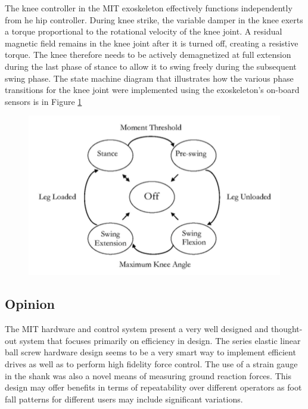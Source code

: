  The knee controller in the MIT exoskeleton effectively functions independently from he hip controller.  During knee strike, the variable damper in the knee exerts a torque proportional to the rotational velocity of the knee joint.  A residual magnetic field remains in the knee joint after it is turned off, creating a resistive torque.  The knee therefore needs to be actively demagnetized at full extension during the last phase of stance to allow it to swing freely during the subsequent swing phase.  The state machine diagram that illustrates how the various phase transitions for the knee joint were implemented using the exoskeleton's on-board sensors is in Figure \ref{fig:kneeControl} 
  \begin{figure}[thpb]
\centering
\includegraphics[width=3.in]{exos/figs/MIT/kneeControl}
  \caption{}
  \vspace{-0.2in}
 \label{fig:kneeControl} 
 \end{figure}  
  
  
% 
 
 
 \subsection{Opinion}
 
 The MIT hardware and control system present a very well designed and thought-out system that focuses primarily on efficiency in design.  The series elastic linear ball screw hardware design seems to be a very smart way to implement efficient drives as well as to perform high fidelity force control.  The use of a strain gauge in the shank was also a novel means of measuring ground reaction forces.  This design may offer benefits in terms of repeatability over different operators as foot fall patterns for different users may include significant variations.
 
